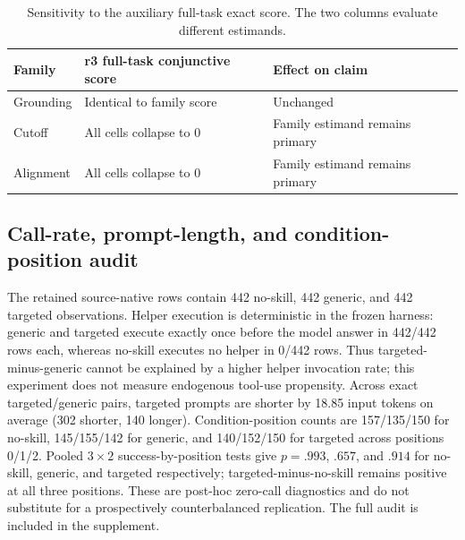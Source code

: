 \begin{table}[ht]
\centering
\scriptsize
\renewcommand{\arraystretch}{0.88}
\setlength{\tabcolsep}{3pt}
\begin{tabular}{lll}
\toprule
Family & r3 full-task conjunctive score & Effect on claim \\
\midrule
Grounding & Identical to family score & Unchanged \\
Cutoff & All cells collapse to 0 & Family estimand remains primary \\
Alignment & All cells collapse to 0 & Family estimand remains primary \\
\bottomrule
\end{tabular}
\caption{Sensitivity to the auxiliary full-task exact score. The two columns evaluate different estimands.}
\label{tab:sensitivity}
\end{table}

\subsection{Call-rate, prompt-length, and condition-position audit}
The retained source-native rows contain 442 no-skill, 442 generic, and 442 targeted observations. Helper execution is deterministic in the frozen harness: generic and targeted execute exactly once before the model answer in 442/442 rows each, whereas no-skill executes no helper in 0/442 rows. Thus targeted-minus-generic cannot be explained by a higher helper invocation rate; this experiment does not measure endogenous tool-use propensity. Across exact targeted/generic pairs, targeted prompts are shorter by 18.85 input tokens on average (302 shorter, 140 longer). Condition-position counts are 157/135/150 for no-skill, 145/155/142 for generic, and 140/152/150 for targeted across positions 0/1/2. Pooled $3\times2$ success-by-position tests give $p=.993$, $.657$, and $.914$ for no-skill, generic, and targeted respectively; targeted-minus-no-skill remains positive at all three positions. These are post-hoc zero-call diagnostics and do not substitute for a prospectively counterbalanced replication. The full audit is included in the supplement.

